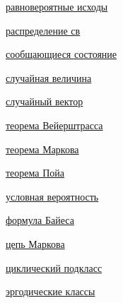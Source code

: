 \documentclass[a4paper,100pt]{article}
\theoremstyle{indented}
\theoremstyle{definition}
\theoremstyle{remark}
\begin{document}
\begin{multicols}{2}
\hyperlink{n3}{равновероятные исходы} \ 

\hyperlink{n9}{распределение св} \ 

\hyperlink{n37}{сообщающиеся состояние} \ 

\hyperlink{n8}{случайная величина} \ 

\hyperlink{n18}{случайный вектор} \ 

\hyperlink{n23}{теорема Вейерштрасса} \ 

\hyperlink{n35}{теорема Маркова} \ 

\hyperlink{n43}{теорема Пойа} \

\hyperlink{n4}{условная вероятность} \ 

\hyperlink{n5}{формула Байеса} \ 

\hyperlink{n29}{цепь Маркова} \ 

\hyperlink{n41}{циклический подкласс} \ 

\hyperlink{n38}{эргодические классы} \ 

\end{multicols}
\end{document}
